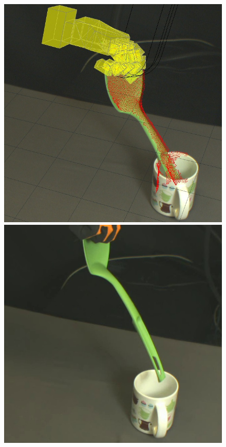 \begin{figure}
\begin{center}
  \includegraphics[width=\tw]{images/experiments/query/spatula-1-s} \hspace{-6pt}
 \includegraphics[width=\tw]{images/experiments/exec/spatula-s}

\end{center}
\end{figure}
